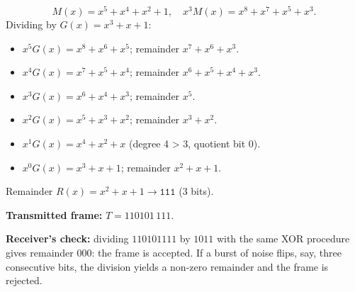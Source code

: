 \documentclass[11pt]{article}
\begin{document}
\begin{exoresolu}[CRC computation with generator $G(x) = x^3 + x + 1$]
\[
M(x) = x^5 + x^4 + x^2 + 1,\quad x^3M(x) = x^8 + x^7 + x^5 + x^3.
\]
Dividing by $G(x) = x^3 + x + 1$:
\begin{itemize}
\item $x^5 G(x) = x^8 + x^6 + x^5$; remainder $x^7 + x^6 + x^3$.
\item $x^4 G(x) = x^7 + x^5 + x^4$; remainder $x^6 + x^5 + x^4 + x^3$.
\item $x^3 G(x) = x^6 + x^4 + x^3$; remainder $x^5$.
\item $x^2 G(x) = x^5 + x^3 + x^2$; remainder $x^3 + x^2$.
\item $x^1 G(x) = x^4 + x^2 + x$ (degree 4 > 3, quotient bit 0).
\item $x^0 G(x) = x^3 + x + 1$; remainder $x^2 + x + 1$.
\end{itemize}
Remainder $R(x) = x^2 + x + 1 \rightarrow \texttt{111}$ (3 bits).

\textbf{Transmitted frame:} $T = 110101\,111$.

\textbf{Receiver's check:} dividing $110101111$ by $1011$ with the same XOR procedure gives remainder $000$: the frame is accepted. If a burst of noise flips, say, three consecutive bits, the division yields a non-zero remainder and the frame is rejected.
\end{exoresolu}
\end{document}
